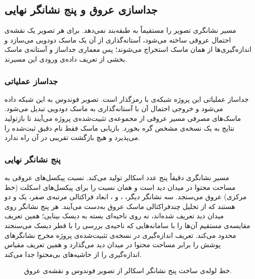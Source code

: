 \subsection{جداسازی عروق و پنج نشانگر نهایی}

مسیر نشانگری تصویر را مستقیماً به طبقه‌بند نمی‌دهد. برای هر تصویر یک نقشه‌ی احتمال عروقی ساخته می‌شود، آستانه‌گذاری از آن یک ماسک دودویی می‌سازد و اندازه‌گیری‌ها از همان ماسک استخراج می‌شوند؛ پس معماری جداساز و آستانه‌ی ماسک بخشی از تعریف داده‌ی ورودی این مسیرند.

\subsubsection{جداساز عملیاتی}

جداساز عملیاتی این پروژه شبکه‌ی  با رمزگذار  است. تصویر فوندوس به این شبکه داده می‌شود و خروجی احتمال آن با آستانه‌گذاری به ماسک دودویی تبدیل می‌شود. ماسک‌های مصرفی مسیر عروقی از مجموعه‌ی تثبیت‌شده‌ی پروژه می‌آیند تا بازتولید نتایج به یک نسخه‌ی مشخص گره بخورد. بازیابی ماسک فقط نام دقیق ثبت‌شده را می‌پذیرد و هیچ بازگشت تقریبی در آن راه ندارد.

\subsubsection{پنج نشانگر نهایی}

مسیر نشانگری دقیقاً پنج عدد اسکالر تولید می‌کند.  نسبت پیکسل‌های عروقی به مساحت محتوا در میدان دید است و  همان نسبت را برای پیکسل‌های اسکلت (خط مرکزی) عروق می‌سنجد. سه نشانگر دیگر، ،  و ، ابعاد فراکتالی مرتبه‌ی صفر، یک و دو هستند که از تحلیل چندفراکتالی ماسک عروق به‌دست می‌آیند. هر پنج نشانگر روی میدان دید تعریف شده‌اند، نه روی ناحیه‌ای بسته به دیسک بینایی؛ همین تعریف مقایسه‌ی مستقیم آن‌ها را با سامانه‌هایی که ناحیه‌ی بررسی را با قطر دیسک می‌سنجند محدود می‌کند. تعریف اندازه‌گیری در نسخه‌ی تثبیت‌شده‌ی پروژه مخرج نشانگرهای پوشش را برابر مساحت محتوا در میدان دید می‌گذارد و همین تعریف مقیاس اندازه‌گیری را از حاشیه‌های بی‌محتوا جدا می‌کند.

\begin{figure}[htbp]
  \centering
  \caption{خط لوله‌ی ساخت پنج نشانگر اسکالر از تصویر فوندوس و نقشه‌ی عروق.}
  \label{fig:U4}
\end{figure}


